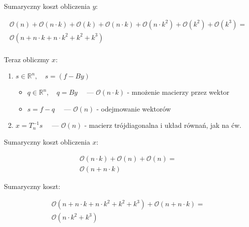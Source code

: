 \documentclass[a4paper]{article}
\newcommand{\R}{\mathbb R} %
\begin{document}
        Sumaryczny koszt obliczenia $y$:

        \begin{gather*}
            \mathcal{O}(n) + \mathcal{O}(n \cdot k) + \mathcal{O}(k) + \mathcal{O}(n \cdot k)
            + \mathcal{O}(n \cdot k^{2}) + \mathcal{O}(k^{2}) + \mathcal{O}(k^{3}) = \\
            \mathcal{O}(n + n \cdot k + n \cdot k^{2} + k^{2} + k^{3}) \\
        \end{gather*}

        Teraz obliczmy $x$:

        \begin{enumerate}
            \item
            $s \in \R^{n}, \quad s = (f - By)$

            \begin{itemize}
                \item
                    $q \in \R^{n}, \quad q = By \quad$ ---
                    $\mathcal{O}(n \cdot k)$ - mnożenie macierzy przez wektor

                \item
                    $s = f - q \quad$ ---
                    $\mathcal{O}(n)$ - odejmowanie wektorów

            \end{itemize}

            \item
                $x = T_{n}^{-1}s \quad$ ---
                $\mathcal{O}(n)$ - macierz trójdiagonalna i układ równań, jak na ćw.

        \end{enumerate}

        Sumaryczny koszt obliczenia $x$:

        \begin{gather*}
            \mathcal{O}(n \cdot k) + \mathcal{O}(n) + \mathcal{O}(n) = \\
            \mathcal{O}(n + n \cdot k)
        \end{gather*}

        Sumaryczny koszt:

        \begin{gather*}
            \mathcal{O}(n + n \cdot k + n \cdot k^{2} + k^{2} + k^{3}) + \mathcal{O}(n + n \cdot k) = \\
            \mathcal{O}(n \cdot k^{2} + k^{3})
        \end{gather*}
\end{document}
